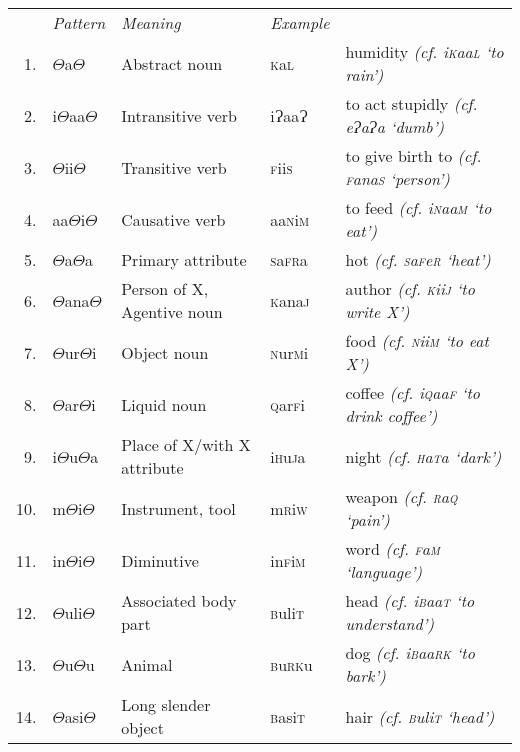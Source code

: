 \documentclass[a4paper,10pt,twoside,openright]{memoir}
\newcommand{\rootpart}{$\Theta$}
\newcommand{\bigglot}{Ɂ}
\newcommand{\famword}[5]{#1\textsc{#2}#3\textsc{#4}#5}
\begin{document}
\begin{table}[ht]
    \centering
    \begin{tabular}{@{}rllll@{}}
    & \textit{Pattern} & \textit{Meaning} & \textit{Example} & \\
    1. & {\rootpart}a{\rootpart} & Abstract noun & \famword{}{k}{a}{l}{} & humidity \emph{(cf. \famword{i}{k}{aa}{l}{} `to rain')}\\
    2. & i{\rootpart}aa{\rootpart} & Intransitive verb & \famword{i}{\bigglot}{aa}{\bigglot}{} & to act stupidly \emph{(cf. e\bigglot a\bigglot a `dumb')} \\
    3. & {\rootpart}ii{\rootpart} & Transitive verb & \famword{}{f}{ii}{s}{} & to give birth to \emph{(cf. \textsc{f}ana\textsc{s} `person')} \\
    4. & aa{\rootpart}i{\rootpart} & Causative verb & \famword{aa}{n}{i}{m}{} & to feed \textit{(cf. \famword{i}{n}{aa}{m}{} `to eat')} \\
    5. & {\rootpart}a{\rootpart}a & Primary attribute & \famword{}{s}{a}{fr}{a} & hot \emph{(cf. \textsc{s}a\textsc{f}e\textsc{r} `heat')} \\
    6. & {\rootpart}ana{\rootpart} & Person of X, Agentive noun & \famword{}{k}{ana}{j}{} & author \emph{(cf. \textsc{k}ii\textsc{j} `to write X')}\\
    7. & {\rootpart}ur{\rootpart}i & Object noun & \famword{}{n}{ur}{m}{i} & food \emph{(cf. \textsc{n}ii\textsc{m} `to eat X')}\\
    8. & {\rootpart}ar{\rootpart}i & Liquid noun & \famword{}{q}{ar}{f}{i} & coffee \emph{(cf. i\textsc{q}aa\textsc{f} `to drink coffee')} \\
    9. & i{\rootpart}u{\rootpart}a & Place of X/with X attribute & \famword{i}{h}{u}{j}{a} & night \emph{(cf. \textsc{h}a\textsc{t}a `dark')} \\
    10. & m{\rootpart}i{\rootpart} & Instrument, tool & \famword{m}{r}{i}{w}{} & weapon \emph{(cf. \textsc{r}a\textsc{q} `pain')} \\
    11. & in{\rootpart}i{\rootpart} & Diminutive & \famword{in}{f}{i}{m}{} & word \textit{(cf. \famword{}{f}{a}{m}{} `language')}\\
    12. & {\rootpart}uli{\rootpart} & Associated body part & \famword{}{b}{uli}{t}{} & head \emph{(cf. i\textsc{b}aa\textsc{t} `to understand')}\\
    13. & {\rootpart}u{\rootpart}u & Animal & \famword{}{b}{u}{rk}{u} & dog \emph{(cf. \famword{i}{b}{aa}{rk}{} `to bark')} \\
    14. & {\rootpart}asi{\rootpart} & Long slender object & \famword{}{b}{asi}{t}{} & hair \emph{(cf. \textsc{b}uli\textsc{t} `head')} \\

\end{tabular}
\end{table}
\end{document}
